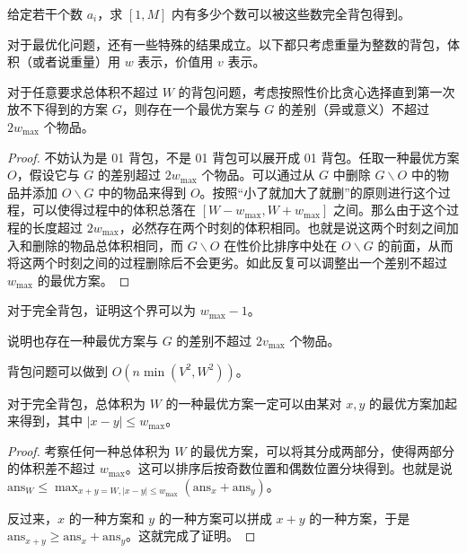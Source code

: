 \begin{example}[同余背包]
    给定若干个数 $a_i$，求 $[1,M]$ 内有多少个数可以被这些数完全背包得到。
\end{example}

对于最优化问题，还有一些特殊的结果成立。以下都只考虑重量为整数的背包，体积（或者说重量）用 $w$ 表示，价值用 $v$ 表示。

\begin{lemma}\label{lemma:knapsack-greedy}
    对于任意要求总体积不超过 $W$ 的背包问题，考虑按照性价比贪心选择直到第一次放不下得到的方案 $G$，则存在一个最优方案与 $G$ 的差别（异或意义）不超过 $2w_{\max}$ 个物品。
\end{lemma}
\begin{proof}
    不妨认为是 01 背包，不是 01 背包可以展开成 01 背包。任取一种最优方案 $O$，假设它与 $G$ 的差别超过 $2w_{\max}$ 个物品。可以通过从 $G$ 中删除 $G\backslash O$ 中的物品并添加 $O\backslash G$ 中的物品来得到 $O$。按照“小了就加大了就删”的原则进行这个过程，可以使得过程中的体积总落在 $[W-w_{\max}, W+w_{\max}]$ 之间。那么由于这个过程的长度超过 $2w_{\max}$，必然存在两个时刻的体积相同。也就是说这两个时刻之间加入和删除的物品总体积相同，而 $G\backslash O$ 在性价比排序中处在 $O\backslash G$ 的前面，从而将这两个时刻之间的过程删除后不会更劣。如此反复可以调整出一个差别不超过 $w_{\max}$ 的最优方案。
\end{proof}
\begin{exercise}
    对于完全背包，证明这个界可以为 $w_{\max}-1$。
\end{exercise}
\begin{exercise}
    说明也存在一种最优方案与 $G$ 的差别不超过 $2v_{\max}$ 个物品。
\end{exercise}
\begin{corollary}
    背包问题可以做到 $O(n\min(V^2,W^2))$。
\end{corollary}


\begin{lemma}\label{lemma:knapsack-split}
    对于完全背包，总体积为 $W$ 的一种最优方案一定可以由某对 $x,y$ 的最优方案加起来得到，其中 $|x-y|\le w_{\max}$。
\end{lemma}
\begin{proof}
    考察任何一种总体积为 $W$ 的最优方案，可以将其分成两部分，使得两部分的体积差不超过 $w_{\max}$。这可以排序后按奇数位置和偶数位置分块得到。也就是说 $\mathrm{ans}_W\le \max_{x+y=W,|x-y|\le w_{\max}} (\mathrm{ans}_x + \mathrm{ans}_y)$。

    反过来，$x$ 的一种方案和 $y$ 的一种方案可以拼成 $x+y$ 的一种方案，于是 $\mathrm{ans}_{x+y} \ge \mathrm{ans}_x + \mathrm{ans}_y$。这就完成了证明。
\end{proof}

